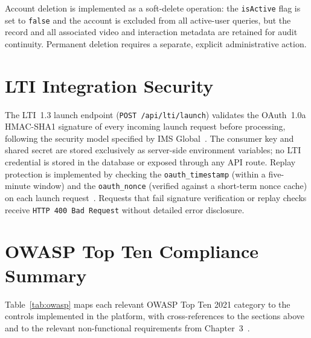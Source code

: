 Account deletion is implemented as a soft-delete operation: the
\texttt{isActive} flag is set to \texttt{false} and the account is
excluded from all active-user queries, but the record and all associated
video and interaction metadata are retained for audit continuity.
Permanent deletion requires a separate, explicit administrative action.

\section{LTI Integration Security}
\label{sec:lti}

The LTI~1.3 launch endpoint (\texttt{POST /api/lti/launch}) validates the
OAuth~1.0a HMAC-SHA1 signature of every incoming launch request before
processing, following the security model specified by IMS
Global~\cite{lti2019}. The consumer key and shared secret are stored
exclusively as server-side environment variables; no LTI credential is
stored in the database or exposed through any API route. Replay protection
is implemented by checking the \texttt{oauth\_timestamp} (within a five-minute
window) and the \texttt{oauth\_nonce} (verified against a short-term nonce
cache) on each launch request~\cite{lti2019}. Requests that fail signature
verification or replay checks receive \texttt{HTTP~400 Bad Request} without
detailed error disclosure.

\section{OWASP Top Ten Compliance Summary}
\label{sec:owasp_summary}

Table~\ref{tab:owasp} maps each relevant OWASP Top Ten 2021 category to the
controls implemented in the platform, with cross-references to the sections
above and to the relevant non-functional requirements from
Chapter~3~\cite{owasp2021}.

